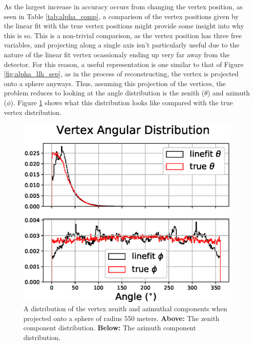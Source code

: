 As the largest increase in accuracy occurs from changing the vertex position, as seen in Table \ref{tab:alpha_comp}, a comparison of the vertex positions given by the linear fit with the true vertex positions might provide some insight into why this is so. This is a non-trivial comparison, as the vertex position has three free variables, and projecting along a single axis isn't particularly useful due to the nature of the linear fit vertex ocassionaly ending up very far away from the detector. For this reason, a useful representation is one similar to that of Figure \ref{fig:alpha_llh_sep}, as in the process of reconstructing, the vertex is projected onto a sphere anyways. Thus, assuming this projection of the vertices, the problem reduces to looking at the angle distribution is the zenith ($\theta$) and azimuth ($\phi$). Figure \ref{fig:vert_dist} shows what this distribution looks like compared with the true vertex distribution. 

\begin{figure}[H]
  \centering
  \includegraphics[width=12cm]{./Figures/reco_plots/angular_vert_dist_modified.eps}
  \caption{A distribution of the vertex zenith and azimuthal components when projected onto a sphere of radius 550 meters. \textbf{Above:} The zenith component distribution. \textbf{Below:} The azimuth component distribution.}
  \label{fig:vert_dist}
\end{figure}

